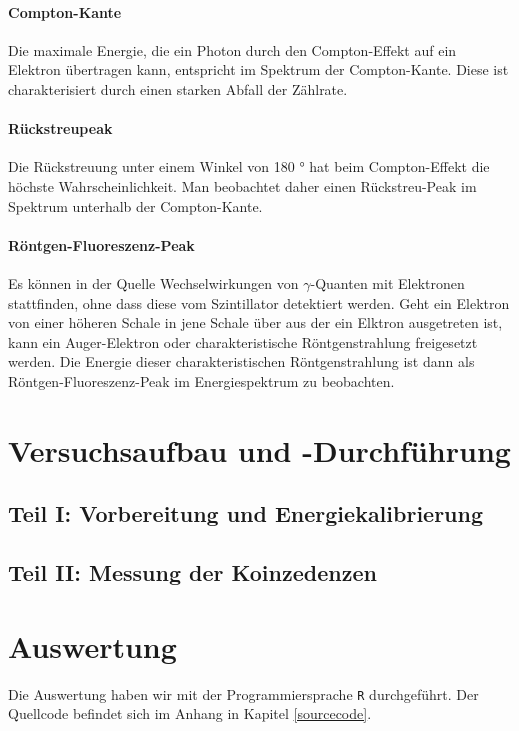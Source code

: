 \documentclass[12pt,listof=totoc]{scrartcl}
\newcommand{\code}[1]{\texttt{#1}}
\begin{document}
 \paragraph{Compton-Kante}
 Die maximale Energie, die ein Photon durch den Compton-Effekt auf ein Elektron übertragen kann, entspricht im Spektrum der Compton-Kante. Diese ist charakterisiert durch einen starken Abfall der Zählrate.
 
 \paragraph{Rückstreupeak}
 
 Die Rückstreuung unter einem Winkel von 180 ° hat beim Compton-Effekt die höchste Wahrscheinlichkeit.
 Man beobachtet daher einen Rückstreu-Peak im Spektrum unterhalb der Compton-Kante.

 
 \paragraph{Röntgen-Fluoreszenz-Peak}
Es können in der Quelle Wechselwirkungen von $\gamma$-Quanten mit Elektronen stattfinden, ohne dass diese vom Szintillator detektiert werden. Geht ein Elektron von einer höheren Schale in jene Schale über aus der ein Elktron ausgetreten ist, kann ein Auger-Elektron oder charakteristische Röntgenstrahlung freigesetzt werden. Die Energie dieser charakteristischen Röntgenstrahlung ist dann als Röntgen-Fluoreszenz-Peak im Energiespektrum zu beobachten.




\newpage
\section{Versuchsaufbau und -Durchführung}

\subsection{Teil I: Vorbereitung und Energiekalibrierung}

\subsection{Teil II: Messung der Koinzedenzen}




\newpage
\section{Auswertung}Die Auswertung haben wir mit der Programmiersprache \code{R} durchgeführt. Der Quellcode befindet sich im Anhang in Kapitel \ref{sourcecode}.
\end{document}
